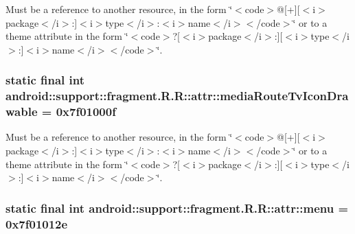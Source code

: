 Must be a reference to another resource, in the form \char`\"{}$<$code$>$@\mbox{[}+\mbox{]}\mbox{[}$<$i$>$package$<$/i$>$:\mbox{]}$<$i$>$type$<$/i$>$:$<$i$>$name$<$/i$>$$<$/code$>$\char`\"{} or to a theme attribute in the form \char`\"{}$<$code$>$?\mbox{[}$<$i$>$package$<$/i$>$:\mbox{]}\mbox{[}$<$i$>$type$<$/i$>$:\mbox{]}$<$i$>$name$<$/i$>$$<$/code$>$\char`\"{}. \hypertarget{classandroid_1_1support_1_1fragment_1_1_r_1_1attr_8defbbf5782122a8681ec9211e6cad6a}{
\subsubsection[{mediaRouteTvIconDrawable}]{\setlength{\rightskip}{0pt plus 5cm}static final int android::support::fragment.R.R::attr::mediaRouteTvIconDrawable = 0x7f01000f}}
\label{classandroid_1_1support_1_1fragment_1_1_r_1_1attr_8defbbf5782122a8681ec9211e6cad6a}


Must be a reference to another resource, in the form \char`\"{}$<$code$>$@\mbox{[}+\mbox{]}\mbox{[}$<$i$>$package$<$/i$>$:\mbox{]}$<$i$>$type$<$/i$>$:$<$i$>$name$<$/i$>$$<$/code$>$\char`\"{} or to a theme attribute in the form \char`\"{}$<$code$>$?\mbox{[}$<$i$>$package$<$/i$>$:\mbox{]}\mbox{[}$<$i$>$type$<$/i$>$:\mbox{]}$<$i$>$name$<$/i$>$$<$/code$>$\char`\"{}. \hypertarget{classandroid_1_1support_1_1fragment_1_1_r_1_1attr_541600bddad9a75602cd38269dfa2424}{
\subsubsection[{menu}]{\setlength{\rightskip}{0pt plus 5cm}static final int android::support::fragment.R.R::attr::menu = 0x7f01012e}}
\label{classandroid_1_1support_1_1fragment_1_1_r_1_1attr_541600bddad9a75602cd38269dfa2424}


